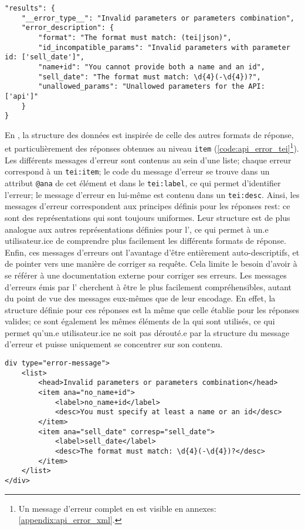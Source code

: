\begin{listing}[h]
	\begin{verbatim}
"results": {
	"__error_type__": "Invalid parameters or parameters combination",
	"error_description": {
		"format": "The format must match: (tei|json)",
		"id_incompatible_params": "Invalid parameters with parameter id: ['sell_date']",
		"name+id": "You cannot provide both a name and an id",
		"sell_date": "The format must match: \d{4}(-\d{4})?",
		"unallowed_params": "Unallowed parameters for the API: ['api']"
	}
}
	\end{verbatim}
	\caption{Corps de réponse en cas d'erreur de la part du client en \json{}}
	\label{code:api_error_json}
\end{listing}

En \xmltei{}, la structure des données est inspirée de celle des autres formats de réponse, et particulièrement des réponses obtenues au niveau \texttt{item} (\ref{code:api_error_tei}\footnote{
	Un message d'erreur complet en \json{} est visible en annexes: \ref{appendix:api_error_xml}.
}). Les différents messages d'erreur sont contenus au sein d'une liste; chaque erreur correspond à un \texttt{tei:item}; le code du message d'erreur se trouve dans un attribut \texttt{@ana} de cet élément et dans le \texttt{tei:label}, ce qui permet d'identifier l'erreur; le message d'erreur en lui-même est contenu dans un \texttt{tei:desc}. Ainsi, les messages d'erreur correspondent aux principes définis pour les réponses \gls{rest}: ce sont des représentations qui sont toujours uniformes. Leur structure est de plus analogue aux autres représentations définies pour l'\api{}, ce qui permet à un.e utilisateur.ice de comprendre plus facilement les différents formats de réponse. Enfin, ces messages d'erreurs ont l'avantage d'être entièrement auto-descriptifs, et de pointer vers une manière de corriger sa requête. Cela limite le besoin d'avoir à se référer à une documentation externe pour corriger ses erreurs. Les messages d'erreurs émis par l'\api{} cherchent à être le plus facilement compréhensibles, autant du point de vue des messages eux-mêmes que de leur encodage. En effet, la structure définie pour ces réponses est la même que celle établie pour les réponses valides; ce sont également les mêmes éléments de la \tei{} qui sont utilisés, ce qui permet qu'un.e utilisateur.ice ne soit pas dérouté.e par la structure du message d'erreur et puisse uniquement se concentrer sur son contenu.

\begin{listing}[h]
	\begin{verbatim}
div type="error-message">
	<list>
		<head>Invalid parameters or parameters combination</head>
		<item ana="no_name+id">
			<label>no_name+id</label>
			<desc>You must specify at least a name or an id</desc>
		</item>
		<item ana="sell_date" corresp="sell_date">
			<label>sell_date</label>
			<desc>The format must match: \d{4}(-\d{4})?</desc>
		</item>
	</list>
</div>
	\end{verbatim}
	\caption{Corps de réponse en cas d'erreur de la part du client en \xmltei{}}
	\label{code:api_error_tei}
\end{listing}

